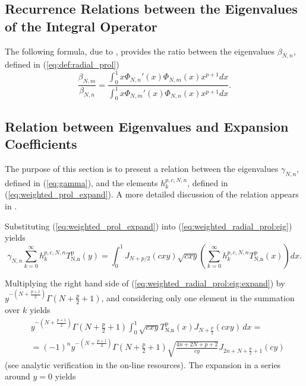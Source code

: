 \documentclass[12pt]{article}
\begin{document}
%
%
%
\subsection{Recurrence Relations between the Eigenvalues of the Integral Operator}

The following formula, due to \cite{serkh2015generalized,greengard2017generalized}, provides the ratio between the eigenvalues $\beta_{N,n}$, defined in (\ref{eq:def:radial_prol})
\begin{equation}\label{eq:eig:rec}
  \frac{\beta_{N,m}}{\beta_{N,n}} = \frac{\int_0^1 x \Phi_{N,n}'(x) \Phi_{N,m}(x) x^{p+1} dx }{\int_0^1 x \Phi_{N,m}'(x) \Phi_{N,n}(x) x^{p+1} dx} .
\end{equation}


%
%
%
\subsection{Relation between Eigenvalues and Expansion Coefficients}

The purpose of this section is to present a relation between the eigenvalues $\gamma_{N,n}$, defined in (\ref{eq:gamma}), and the elements ${h}^{p,c,N,n}_k$, defined in (\ref{eq:weighted_prol_expand}). 
A more detailed discussion of the relation appears in \cite{slepian1964prolate,serkh2015generalized,greengard2017generalized}.


Substituting (\ref{eq:weighted_prol_expand}) into (\ref{eq:weighted_radial_prol:eig}) yields
\begin{equation}\label{eq:weighted_radial_prol:eig:expand}
  \gamma_{N,n} \sum_{k=0}^{\infty} {h}^{p,c,N,n}_k T_{\text{N,n}}^{\text{p}}(y) = \int_0^1 {J_{N+p/2}(cxy)} \sqrt{cxy} \left(\sum_{k=0}^{\infty} {h}^{p,c,N,n}_k T_{\text{N,n}}^{\text{p}}(x) \right) dx .
\end{equation}

Multiplying the right hand side of (\ref{eq:weighted_radial_prol:eig:expand}) by $y^{-\left(N+\frac{p+1}{2}\right)} \Gamma \left(N+\frac{p}{2}+1\right)$, and considering only one element in the summation over $k$ yields
\begin{equation}\label{eq:expand-eig:rhs}
\begin{split}
& y^{-\left(N+\frac{p+1}{2}\right)} \Gamma \left(N+\frac{p}{2}+1\right) \int_0^1 \sqrt{c x y} T_{\text{N,n}}^{\text{p}}(x) J_{N+\frac{p}{2}}(c x y) \, dx = \\
& = (-1)^n y^{-\left(N+\frac{p+1}{2}\right)} \Gamma \left(N+\frac{p}{2}+1\right) \sqrt{\frac{4 n+2 N+p+2}{c y}} J_{2 n+N+\frac{p}{2}+1}(c y) 
\end{split}
\end{equation}
(see analytic verification in the on-line resources). 
The expansion in a series around $y=0$ yields
\end{document}
